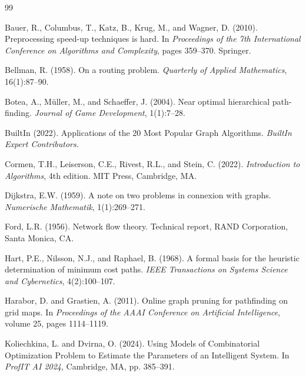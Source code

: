 \documentclass[12pt, a4paper, oneside]{report}
\theoremstyle{definition}
\begin{document}

\begin{thebibliography}{99}

Bauer, R., Columbus, T., Katz, B., Krug, M., and Wagner, D. (2010).
\newblock Preprocessing speed-up techniques is hard.
\newblock In \emph{Proceedings of the 7th International Conference on Algorithms and Complexity}, pages 359--370. Springer.

Bellman, R. (1958).
\newblock On a routing problem.
\newblock \emph{Quarterly of Applied Mathematics}, 16(1):87--90.

Botea, A., Müller, M., and Schaeffer, J. (2004).
\newblock Near optimal hierarchical path-finding.
\newblock \emph{Journal of Game Development}, 1(1):7--28.

BuiltIn (2022).
\newblock Applications of the 20 Most Popular Graph Algorithms.
\newblock \emph{BuiltIn Expert Contributors}.

Cormen, T.H., Leiserson, C.E., Rivest, R.L., and Stein, C. (2022).
\newblock \emph{Introduction to Algorithms}, 4th edition.
\newblock MIT Press, Cambridge, MA.

Dijkstra, E.W. (1959).
\newblock A note on two problems in connexion with graphs.
\newblock \emph{Numerische Mathematik}, 1(1):269--271.

Ford, L.R. (1956).
\newblock Network flow theory.
\newblock Technical report, RAND Corporation, Santa Monica, CA.

Hart, P.E., Nilsson, N.J., and Raphael, B. (1968).
\newblock A formal basis for the heuristic determination of minimum cost paths.
\newblock \emph{IEEE Transactions on Systems Science and Cybernetics}, 4(2):100--107.

Harabor, D. and Grastien, A. (2011).
\newblock Online graph pruning for pathfinding on grid maps.
\newblock In \emph{Proceedings of the AAAI Conference on Artificial Intelligence}, volume 25, pages 1114--1119.

Koliechkina, L. and Dvirna, O. (2024).
\newblock Using Models of Combinatorial Optimization Problem to Estimate the Parameters of an Intelligent System.
\newblock In \emph{ProfIT AI 2024}, Cambridge, MA, pp. 385--391.


\end{thebibliography}
\end{document}
